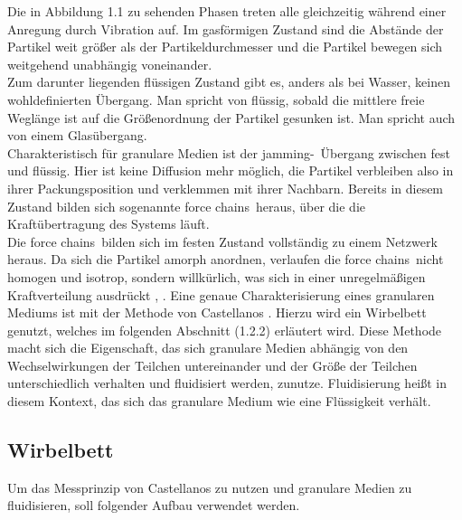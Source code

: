 Die in Abbildung 1.1 zu sehenden Phasen treten alle gleichzeitig während einer Anregung durch Vibration auf. Im gasförmigen Zustand sind die Abstände der Partikel weit größer als der Partikeldurchmesser und die Partikel bewegen sich weitgehend unabhängig voneinander. \\
Zum darunter liegenden flüssigen Zustand gibt es, anders als bei Wasser, keinen wohldefinierten Übergang. Man spricht von flüssig, sobald die mittlere freie Weglänge ist auf die Größenordnung der Partikel gesunken ist. Man spricht auch von einem Glasübergang. \\
Charakteristisch für granulare Medien ist der \glqq jamming\grqq-\ Übergang zwischen fest und flüssig. Hier ist keine Diffusion mehr möglich, die Partikel verbleiben also in ihrer Packungsposition und verklemmen mit ihrer Nachbarn. Bereits in diesem Zustand bilden sich sogenannte \glqq force chains\grqq \ heraus, über die die Kraftübertragung des Systems läuft. \\
Die \glqq force chains\grqq \ bilden sich im festen Zustand vollständig zu einem Netzwerk heraus. Da sich die Partikel amorph anordnen, verlaufen die \glqq force chains\grqq \ nicht homogen und isotrop, sondern willkürlich, was sich in einer unregelmäßigen Kraftverteilung ausdrückt \cite{Darmstadt2015}, \cite{Fallturmexperiment}.
Eine genaue Charakterisierung eines granularen Mediums ist mit der Methode von Castellanos \cite{Castellanos2000}. Hierzu wird ein Wirbelbett genutzt, welches im folgenden Abschnitt (1.2.2) erläutert wird. Diese Methode macht sich die Eigenschaft, das sich granulare Medien abhängig von den Wechselwirkungen der Teilchen untereinander und der Größe der Teilchen unterschiedlich verhalten und fluidisiert werden, zunutze. Fluidisierung heißt in diesem Kontext, das sich das granulare Medium wie eine Flüssigkeit verhält.

\subsection{Wirbelbett}

Um das Messprinzip von Castellanos zu nutzen und granulare Medien zu fluidisieren, soll folgender Aufbau verwendet werden.


